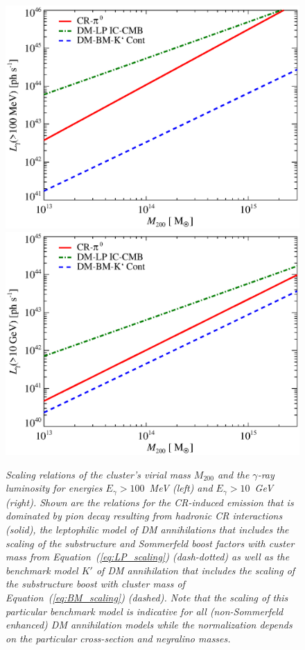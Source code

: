 \documentclass[10pt,aps,pra,reprint,amsmath,amsfonts,amssymb,showpacs]{revtex4-1}
\begin{document}
\begin{figure}
  \includegraphics[width=0.99\columnwidth]{figures/MLscaling.100M.eps}
  \includegraphics[width=0.99\columnwidth]{figures/MLscaling.10G.eps}
  \caption{\it Scaling relations of the cluster's virial mass $M_{200}$ and the
    $\gamma$-ray luminosity for energies $E_\gamma>100$~MeV (left) and
    $E_\gamma>10$~GeV (right).  Shown are the relations for the CR-induced
    emission that is dominated by pion decay resulting from hadronic CR
    interactions (solid), the leptophilic model of DM annihilations that
    includes the scaling of the substructure and Sommerfeld boost factors with
    custer mass from Equation~(\ref{eq:LP_scaling}) (dash-dotted) as well as the
    benchmark model $K'$ of DM annihilation that includes the scaling of the
    substructure boost with cluster mass of Equation~(\ref{eq:BM_scaling})
    (dashed). Note that the scaling of this particular benchmark model is
    indicative for all (non-Sommerfeld enhanced) DM annihilation models while
    the normalization depends on the particular cross-section and neyralino
    masses.}
\label{fig:lum_mass_scaling}
\end{figure}
\end{document}
